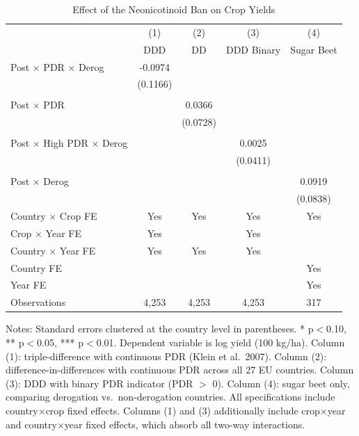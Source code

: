 \begin{table}[H]
\centering
\caption{Effect of the Neonicotinoid Ban on Crop Yields}
\label{tab:main}
\begin{threeparttable}
\begin{tabular}{lcccc}
\toprule
 & (1) & (2) & (3) & (4) \\
 & DDD & DD & DDD Binary & Sugar Beet \\
\midrule
Post $\times$ PDR $\times$ Derog & -0.0974 & & & \\
 & (0.1166) & & & \\
 \\
Post $\times$ PDR & & 0.0366 & & \\
 & & (0.0728) & & \\
 \\
Post $\times$ High PDR $\times$ Derog & & & 0.0025 & \\
 & & & (0.0411) & \\
 \\
Post $\times$ Derog & & & & 0.0919 \\
 & & & & (0.0838) \\
\midrule
Country $\times$ Crop FE & Yes & Yes & Yes & Yes \\
Crop $\times$ Year FE & Yes & & Yes & \\
Country $\times$ Year FE & Yes & Yes & Yes & \\
Country FE & & & & Yes \\
Year FE & & & & Yes \\
Observations & 4,253 & 4,253 & 4,253 & 317 \\
\bottomrule
\end{tabular}
\begin{tablenotes}[flushleft]
\small
\item Notes: Standard errors clustered at the country level in parentheses. * p$<$0.10, ** p$<$0.05, *** p$<$0.01. Dependent variable is log yield (100 kg/ha). Column (1): triple-difference with continuous PDR (Klein et al.\ 2007). Column (2): difference-in-differences with continuous PDR across all 27 EU countries. Column (3): DDD with binary PDR indicator (PDR $>$ 0). Column (4): sugar beet only, comparing derogation vs.\ non-derogation countries. All specifications include country$\times$crop fixed effects. Columns (1) and (3) additionally include crop$\times$year and country$\times$year fixed effects, which absorb all two-way interactions.
\end{tablenotes}
\end{threeparttable}
\end{table}

